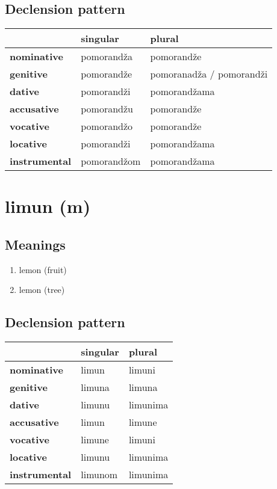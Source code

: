 \subsection*{Declension pattern}
\begin{tabularx}{\linewidth}{Xll}
\toprule
{} &     singular &                    plural \\
\midrule
\textbf{nominative  } &   pomorandža &                pomorandže \\
\textbf{genitive    } &   pomorandže &  pomoranadža / pomorandži \\
\textbf{dative      } &   pomorandži &              pomorandžama \\
\textbf{accusative  } &   pomorandžu &                pomorandže \\
\textbf{vocative    } &   pomorandžo &                pomorandže \\
\textbf{locative    } &   pomorandži &              pomorandžama \\
\textbf{instrumental} &  pomorandžom &              pomorandžama \\
\bottomrule
\end{tabularx}

\filbreak
\section{limun (m)}
\subsection*{Meanings}
\begin{enumerate}
\item lemon (fruit)
\item lemon (tree)
\end{enumerate}
\subsection*{Declension pattern}
\begin{tabularx}{\linewidth}{Xll}
\toprule
{} & singular &    plural \\
\midrule
\textbf{nominative  } &    limun &    limuni \\
\textbf{genitive    } &   limuna &    limuna \\
\textbf{dative      } &   limunu &  limunima \\
\textbf{accusative  } &    limun &    limune \\
\textbf{vocative    } &   limune &    limuni \\
\textbf{locative    } &   limunu &  limunima \\
\textbf{instrumental} &  limunom &  limunima \\
\bottomrule
\end{tabularx}

